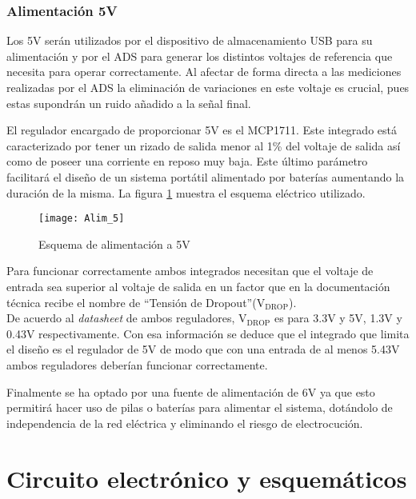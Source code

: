 \subsubsection{Alimentación 5V\label{sec:Alimentacion_5V}}

Los 5V serán utilizados por el dispositivo de almacenamiento USB para su alimentación y por el ADS para generar los distintos voltajes de referencia que necesita para operar correctamente. Al afectar de forma directa a las mediciones realizadas por el ADS la eliminación de variaciones en este voltaje es crucial, pues estas supondrán un ruido añadido a la señal final.

El regulador encargado de proporcionar 5V es el MCP1711. Este integrado está caracterizado por tener un rizado de salida menor al 1\% del voltaje de salida así como de poseer una corriente en reposo muy baja. Este último parámetro facilitará el diseño de un sistema portátil alimentado por baterías aumentando la duración de la misma. La figura \ref{fig:Alim_5} muestra el esquema eléctrico utilizado.

\begin{figure} [h]
    \centering
    \texttt{[image: Alim\_5]}
    \caption{Esquema de alimentación a 5V}
    \label{fig:Alim_5}
\end{figure}

Para funcionar correctamente ambos integrados necesitan que el voltaje de entrada sea superior al voltaje de salida en un factor que en la documentación técnica recibe el nombre de ``\gls{Tensión de Dropout}''(V$_{\text{DROP}}$).
\\De acuerdo al \textit{datasheet} de ambos reguladores, V$_{\text{DROP}}$ es para 3.3V y 5V, 1.3V y 0.43V respectivamente. Con esa información se deduce que el integrado que limita el diseño es el regulador de 5V de modo que con una entrada de al menos 5.43V ambos reguladores deberían funcionar correctamente.

Finalmente se ha optado por una fuente de alimentación de 6V ya que esto permitirá hacer uso de pilas o baterías para alimentar el sistema, dotándolo de independencia de la red eléctrica y eliminando el riesgo de electrocución.

\clearpage

\section{Circuito electrónico y esquemáticos\label{sec:Esquemáticos}}

